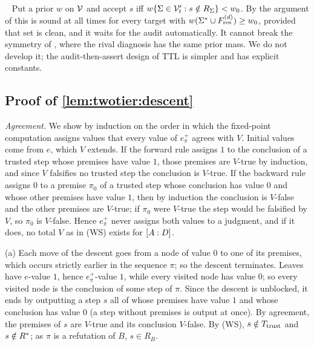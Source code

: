 \begin{remark}\ \label{rem:twotier:bayes}
Put a prior $w$ on $\mathcal{V}$ and accept $s$ iff $w\{\Sigma\in\mathcal{V}'_t:s\notin R_\Sigma\}<w_0$. By the argument of  this is sound at all times for every target with $w(\Sigma^*\cup F^{(d)}_{\mathrm{res}})\ge w_0$, provided that set is clean, and it waits for the audit automatically. It cannot break the symmetry of , where the rival diagnosis has the same prior mass. We do not develop it; the audit-then-assert design of TTL is simpler and has explicit constants.
\end{remark}

\subsection{Proof of \texorpdfstring{\cref{lem:twotier:descent}}{the descent lemma}}\label{app:twotier:descent}

\emph{Agreement.} We show by induction on the order in which the fixed-point computation assigns values that every value of $e^+_\pi$ agrees with $V$. Initial values come from $e$, which $V$ extends. If the forward rule assigns $1$ to the conclusion of a trusted step whose premises have value $1$, those premises are $V$-true by induction, and since $V$ falsifies no trusted step the conclusion is $V$-true. If the backward rule assigns $0$ to a premise $\pi_0$ of a trusted step whose conclusion has value $0$ and whose other premises have value $1$, then by induction the conclusion is $V$-false and the other premises are $V$-true; if $\pi_0$ were $V$-true the step would be falsified by $V$, so $\pi_0$ is $V$-false. Hence $e^+_\pi$ never assigns both values to a judgment, and if it does, no total $V$ as in (WS) exists for $[A : D]$.

(a) Each move of the descent goes from a node of value $0$ to one of its premises, which occurs strictly earlier in the sequence $\pi$; so the descent terminates. Leaves have $e$-value $1$, hence $e^+_\pi$-value $1$, while every visited node has value $0$; so every visited node is the conclusion of some step of $\pi$. Since the descent is unblocked, it ends by outputting a step $s$ all of whose premises have value $1$ and whose conclusion has value $0$ (a step without premises is output at once). By agreement, the premises of $s$ are $V$-true and its conclusion $V$-false. By (WS), $s\notin T_{\mathrm{trust}}$ and $s\notin R^{*}$; as $\pi$ is a refutation of $B$, $s\in R_B$.

